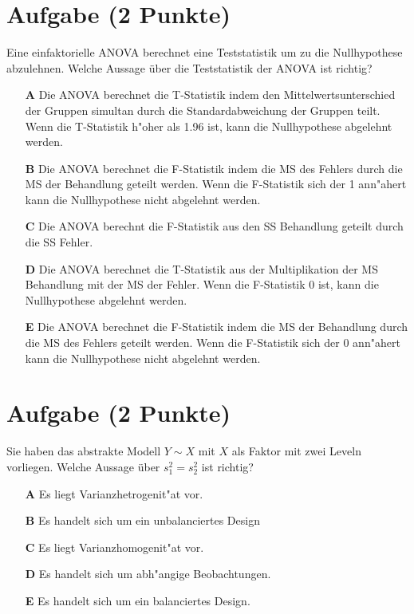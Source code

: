 \documentclass[a4paper, 10pt]{scrartcl}\usepackage[]{graphicx}\usepackage[]{xcolor}
\begin{document}
\section{Aufgabe \hfill (2 Punkte)}

Eine einfaktorielle ANOVA berechnet eine Teststatistik um zu die Nullhypothese abzulehnen. Welche Aussage {\"u}ber die Teststatistik der ANOVA ist richtig?



\begin{enumerate}
\item [\textbf{A} \msquare] Die ANOVA berechnet die T-Statistik indem den Mittelwertsunterschied der Gruppen simultan durch die Standardabweichung der Gruppen teilt. Wenn die T-Statistik h{"o}her als 1.96 ist, kann die Nullhypothese abgelehnt werden.
\item [\textbf{B} \msquare] Die ANOVA berechnet die F-Statistik indem die MS des Fehlers durch die MS der Behandlung geteilt werden. Wenn die F-Statistik sich der 1 ann{"a}hert kann die Nullhypothese nicht abgelehnt werden.
\item [\textbf{C} \msquare] Die ANOVA berechnt die F-Statistik aus den SS Behandlung geteilt durch die SS Fehler.
\item [\textbf{D} \msquare] Die ANOVA berechnet die T-Statistik aus der Multiplikation der MS Behandlung mit der MS der Fehler. Wenn die F-Statistik 0 ist, kann die Nullhypothese abgelehnt werden.
\item [\textbf{E} \msquare] Die ANOVA berechnet die F-Statistik indem die MS der Behandlung durch die MS des Fehlers geteilt werden. Wenn die F-Statistik sich der 0 ann{"a}hert kann die Nullhypothese nicht abgelehnt werden.
\end{enumerate} 

\section{Aufgabe \hfill (2 Punkte)}




Sie haben das abstrakte Modell $Y \sim X$ mit $X$ als Faktor mit zwei
Leveln vorliegen. Welche Aussage {\"u}ber $s^2_1 = s^2_2$ ist richtig?



\begin{enumerate}
\item [\textbf{A} \msquare] Es liegt Varianzhetrogenit{"a}t vor.
\item [\textbf{B} \msquare] Es handelt sich um ein unbalanciertes Design
\item [\textbf{C} \msquare] Es liegt Varianzhomogenit{"a}t vor.
\item [\textbf{D} \msquare] Es handelt sich um abh{"a}ngige Beobachtungen.
\item [\textbf{E} \msquare] Es handelt sich um ein balanciertes Design.
\end{enumerate} 
\end{document}
